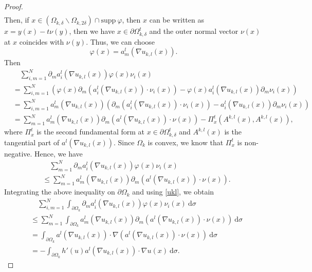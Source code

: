 \documentclass[reqno, 11pt]{amsart} %
\numberwithin{equation}{section}
\theoremstyle{definition}
\newcommand{\pa}{\partial}
\begin{document}
\begin{proof}
\begin{align*}
    \end{align*}
    Then, if $x \in (\Omega_{k,\delta} \backslash \Omega_{k, 2\delta}) \cap \text{supp} \ \varphi $, then $x$ can be written as $x = y(x)-t\nu(y)$, then we have $x \in \pa \Omega_{k,\delta}^{t}$ and the outer normal vector $\nu(x)$ at $x$ coincides with $\nu(y)$. Thus, we can choose $$\varphi(x) = a_m^l(\nabla u_{k,l}(x)).$$ 
    Then
    \begin{align*}
        & \quad \sum_{i,m=1}^{N} \pa_m a_i^l(\nabla u_{k,l}(x))\varphi(x) \nu_i(x) \\
        &= \sum_{i,m=1}^{N} \left(\varphi(x) \pa_m  (a^l_i(\nabla u_{k,l}(x)) \cdot \nu_i(x)) - \varphi(x) a_i^l(\nabla u_{k,l}(x)) \pa_m \nu_i(x) \right)\\
        & = \sum_{i,m=1}^{N} a_m^l(\nabla u_{k,l}(x)) \left( \pa_m  (a^l_i(\nabla u_{k,l}(x)) \cdot \nu_i(x))  - a_i^l(\nabla u_{k,l}(x)) \pa_m \nu_i(x) \right)\\
        & = \sum_{m=1}^{N} a_m^l(\nabla u_{k,l}(x)) \pa_m  (a^l(\nabla u_{k,l}(x)) \cdot \nu(x)) - \Pi_x^t(A^{k,l}(x), A^{k,l}(x)),
    \end{align*}
    where $\Pi_{x}^{t}$ is the second fundamental form at $x \in \pa \Omega_{k,\delta}^{t}$ and $A^{k,l}(x)$ is the tangential part of $a^l(\nabla u_{k,l}(x))$. Since $\Omega_k$ is convex, we know that $\Pi_{x}^t$ is non-negative. Hence, we have
    \begin{align*}
        & \quad \sum_{m=1}^{N} \pa_m a_i^l(\nabla u_{k,l}(x))\varphi(x) \nu_i(x)  \\
        & \leq \sum_{m=1}^{N} a_m^l(\nabla u_{k,l}(x)) \pa_m  (a^l(\nabla u_{k,l}(x)) \cdot \nu(x)).
    \end{align*}
    Integrating the above inequality on $\pa \Omega_k$ and using \eqref{ukl}, we obtain
    \begin{align}\label{test3}
        & \quad \sum_{i,m=1}^{N} \int_{\pa \Omega_k}\pa_m a_i^l(\nabla u_{k,l}(x))\varphi(x) \nu_i(x) \ \text{d} \sigma \nonumber \\
        & \leq \sum_{m=1}^{N} \int_{\pa \Omega_k} a_m^l(\nabla u_{k,l}(x)) \pa_m  (a^l(\nabla u_{k,l}(x)) \cdot \nu(x)) \ \text{d} \sigma \nonumber \\
        & = \int_{\pa \Omega_k} a^l(\nabla u_{k,l}(x)) \cdot  \nabla (a^l(\nabla u_{k,l}(x)) \cdot \nu(x)) \ \text{d} \sigma \\
        & = -  \int_{\pa \Omega_k} h'(u)a^l(\nabla u_{k,l}(x)) \cdot  \nabla u(x) \ \text{d} \sigma. \nonumber
    \end{align}

\end{proof}
\end{document}
